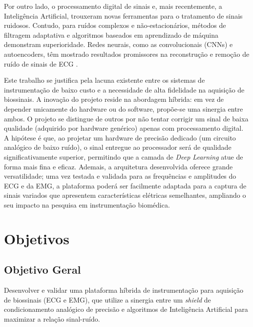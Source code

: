 \documentclass[tcc,capa]{texufpel}
\begin{document}
Por outro lado, o processamento digital de sinais e, mais recentemente, a Inteligência Artificial, trouxeram novas ferramentas para o tratamento de sinais ruidosos. Contudo, para ruídos complexos e não-estacionários, métodos de filtragem adaptativa \cite{widrow1975} e algoritmos baseados em aprendizado de máquina demonstram superioridade. Redes neurais, como as convolucionais (CNNs) e autoencoders, têm mostrado resultados promissores na reconstrução e remoção de ruído de sinais de ECG \cite{antczak2018}.

Este trabalho se justifica pela lacuna existente entre os sistemas de instrumentação de baixo custo e a necessidade de alta fidelidade na aquisição de biossinais. A inovação do projeto reside na abordagem híbrida: em vez de depender unicamente do hardware ou do software, propõe-se uma sinergia entre ambos. O projeto se distingue de outros por não tentar corrigir um sinal de baixa qualidade (adquirido por hardware genérico) apenas com processamento digital. A hipótese é que, ao projetar um hardware de precisão dedicado (um circuito analógico de baixo ruído), o sinal entregue ao processador será de qualidade significativamente superior, permitindo que a camada de \textit{Deep Learning} atue de forma mais fina e eficaz. Ademais, a arquitetura desenvolvida oferece grande versatilidade; uma vez testada e validada para as frequências e amplitudes do ECG e da EMG, a plataforma poderá ser facilmente adaptada para a captura de sinais variados que apresentem características elétricas semelhantes, ampliando o seu impacto na pesquisa em instrumentação biomédica.

\section{Objetivos}

\subsection{Objetivo Geral}
Desenvolver e validar uma plataforma híbrida de instrumentação para aquisição de biossinais (ECG e EMG), que utilize a sinergia entre um \textit{shield} de condicionamento analógico de precisão e algoritmos de Inteligência Artificial para maximizar a relação sinal-ruído.
\end{document}
